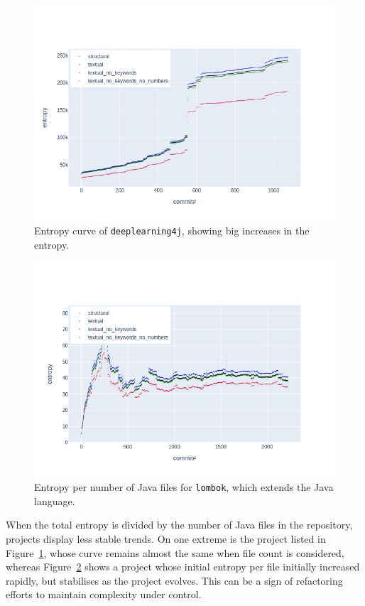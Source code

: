 \documentclass[10pt,conference]{IEEEtran}
\begin{document}
\begin{figure}
    \centering
    \includegraphics[width=\linewidth,trim=0 30 60 90,clip]{project-entropy-history/dl4j.png}
    \caption{Entropy curve of \texttt{deeplearning4j}, showing big increases in the entropy.}
    \label{history-dl4j}
\end{figure}

\begin{figure}
    \centering
    \includegraphics[width=\linewidth,trim=0 30 60 90,clip]{project-entropy-history/lombok-per-file.png}
    \caption{Entropy per number of Java files for \texttt{lombok}, which extends the Java language.}
    \label{history-lombok-per-file}
\end{figure}

When the total entropy is divided by the number of Java files in the repository, projects display less stable trends. On one extreme is the project listed in Figure~\ref{history-dl4j}, whose curve remains almost the same when file count is considered, whereas Figure~\ref{history-lombok-per-file} shows a project whose initial entropy per file initially increased rapidly, but stabilises as the project evolves. This can be a sign of refactoring efforts to maintain complexity under control.
\end{document}

